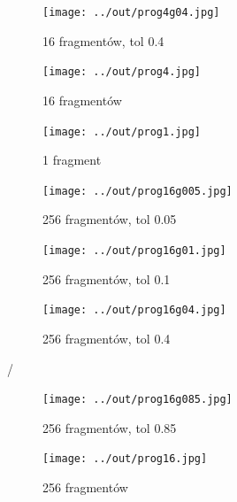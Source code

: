 \documentclass[a4paper,12pt]{article}
\begin{document}
\begin{figure}[h!]
\begin{minipage}[t]{6.5cm}
\begin{center}
\texttt{[image: ../out/prog4g04.jpg]}
\caption{16 fragmentów, tol 0.4}
\end{center}
\end{minipage}
\hfill
\begin{minipage}[t]{6.5cm}
\begin{center}
\texttt{[image: ../out/prog4.jpg]}
\caption{16 fragmentów}
\end{center}
\end{minipage}
\end{figure}



\begin{figure}[h!]
\begin{minipage}[t]{6.5cm}
\begin{center}
\texttt{[image: ../out/prog1.jpg]}
\caption{1 fragment}
\end{center}
\end{minipage}
\hfill
\begin{minipage}[t]{6.5cm}
\begin{center}
\texttt{[image: ../out/prog16g005.jpg]}
\caption{256 fragmentów, tol 0.05}
\end{center}
\end{minipage}
\end{figure}

\begin{figure}[h!]
\begin{minipage}[t]{6.5cm}
\begin{center}
\texttt{[image: ../out/prog16g01.jpg]}
\caption{256 fragmentów, tol 0.1}
\end{center}
\end{minipage}
\hfill
\begin{minipage}[t]{6.5cm}
\begin{center}
\texttt{[image: ../out/prog16g04.jpg]}
\caption{256 fragmentów, tol 0.4}
\end{center}
\end{minipage}
\end{figure}/

\begin{figure}[h!]
\begin{minipage}[t]{6.5cm}
\begin{center}
\texttt{[image: ../out/prog16g085.jpg]}
\caption{256 fragmentów, tol 0.85}
\end{center}
\end{minipage}
\hfill
\begin{minipage}[t]{6.5cm}
\begin{center}
\texttt{[image: ../out/prog16.jpg]}
\caption{256 fragmentów}
\end{center}
\end{minipage}
\end{figure}
\end{document}
